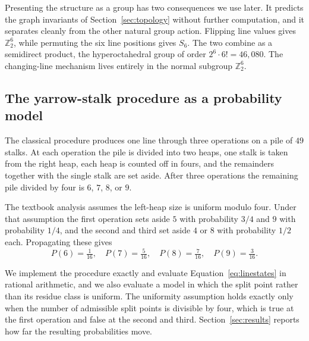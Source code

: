 \documentclass[11pt,a4paper]{article}
\newcommand{\Ztwo}{\mathbb{Z}_2}
\begin{document}
Presenting the structure as a group has two consequences we use later. It
predicts the graph invariants of Section~\ref{sec:topology} without further
computation, and it separates cleanly from the other natural group action.
Flipping line values gives $\Ztwo^6$, while permuting the six line positions
gives $S_6$. The two combine as a semidirect product, the hyperoctahedral group
of order $2^6 \cdot 6! = 46{,}080$. The changing-line mechanism lives entirely in
the normal subgroup $\Ztwo^6$.

\subsection{The yarrow-stalk procedure as a probability model}
\label{sec:yarrow}

The classical procedure produces one line through three operations on a pile of
$49$ stalks. At each operation the pile is divided into two heaps, one stalk is
taken from the right heap, each heap is counted off in fours, and the remainders
together with the single stalk are set aside. After three operations the
remaining pile divided by four is $6$, $7$, $8$, or $9$.

The textbook analysis assumes the left-heap size is uniform modulo four. Under
that assumption the first operation sets aside $5$ with probability $3/4$ and
$9$ with probability $1/4$, and the second and third set aside $4$ or $8$ with
probability $1/2$ each. Propagating these gives
\begin{equation}
P(6) = \tfrac{1}{16}, \quad
P(7) = \tfrac{5}{16}, \quad
P(8) = \tfrac{7}{16}, \quad
P(9) = \tfrac{3}{16}.
\label{eq:linestates}
\end{equation}

We implement the procedure exactly and evaluate Equation~\eqref{eq:linestates}
in rational arithmetic, and we also evaluate a model in which the split point
rather than its residue class is uniform. The uniformity assumption holds
exactly only when the number of admissible split points is divisible by four,
which is true at the first operation and false at the second and third.
Section~\ref{sec:results} reports how far the resulting probabilities move.
\end{document}
